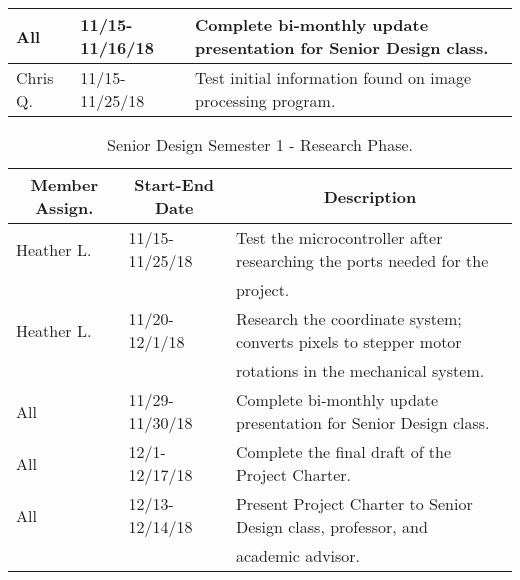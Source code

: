 \documentclass[10pt,onecolumn,draftclsnofoot]{IEEEtran} 					%
\begin{document}
\begin{table} [H]
\begin{tabular}{|l|l|l|}
					All & 11/15-11/16/18 & Complete bi-monthly update presentation for Senior Design class.\\
				\hline
					Chris Q. & 11/15-11/25/18 & Test initial information found on image processing program.\\
				\hline
		\end{tabular} 
	\end{table}	

	\setlength{\parindent}{5ex}
\begin{table} [H]	
\normalsize
	\centering
		\begin{tabular}{|l|l|l|}
			\hline
				\multicolumn{1}{|c|}{\textbf{Member Assign.}} & \multicolumn{1}{|c|}{\textbf{Start-End Date}} & \multicolumn{1}{|c|}{\textbf{Description}} \\
				\hline
					Heather L. & 11/15-11/25/18 & Test the microcontroller after researching the ports needed for the \\
					& & project.\\
				\hline
					Heather L. & 11/20-12/1/18 & Research the coordinate system; converts pixels to stepper motor \\
					& & rotations in the mechanical system.\\
				\hline
					All & 11/29-11/30/18 & 
					Complete bi-monthly update presentation for Senior Design class.\\
				\hline
					All & 12/1-12/17/18 & 
					Complete the final draft of the Project Charter.\\
				\hline
					All & 12/13-12/14/18 & 
					Present Project Charter to Senior Design class, professor, and \\
					& & academic advisor.\\
				\hline
		\end{tabular} 
		\caption{Senior Design Semester 1 - Research Phase.}
		\label{table:2}
	\end{table}	
\end{document}
